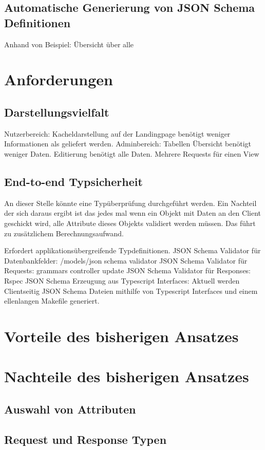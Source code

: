 \subsection{Automatische Generierung von JSON Schema Definitionen}
Anhand von Beispiel: Übersicht über alle

\section{Anforderungen}

\subsection{Darstellungsvielfalt}
Nutzerbereich:
Kacheldarstellung auf der Landingpage benötigt weniger Informationen als geliefert werden.
Adminbereich:
Tabellen Übersicht benötigt weniger Daten. Editierung benötigt alle Daten.
Mehrere Requests für einen View

\subsection{End-to-end Typsicherheit}
An dieser Stelle könnte eine Typüberprüfung durchgeführt werden. Ein Nachteil der sich daraus ergibt ist das jedes mal wenn ein Objekt
mit Daten an den Client geschickt wird, alle Attribute dieses Objekts validiert werden müssen. Das führt zu zusätzlichem Berechnungsaufwand.

Erfordert applikationsübergreifende Typdefinitionen.
JSON Schema Validator für Datenbankfelder:
/models/json schema validator
JSON Schema Validator für Requests:
grammars controller update
JSON Schema Validator für Responses:
Rspec
JSON Schema Erzeugung aus Typescript Interfaces:
Aktuell werden Clientseitig JSON Schema Dateien mithilfe von Typescript Interfaces und einem ellenlangen Makefile generiert.

\section{Vorteile des bisherigen Ansatzes}
\section{Nachteile des bisherigen Ansatzes}
\subsection{Auswahl von Attributen}
\subsection{Request und Response Typen}
